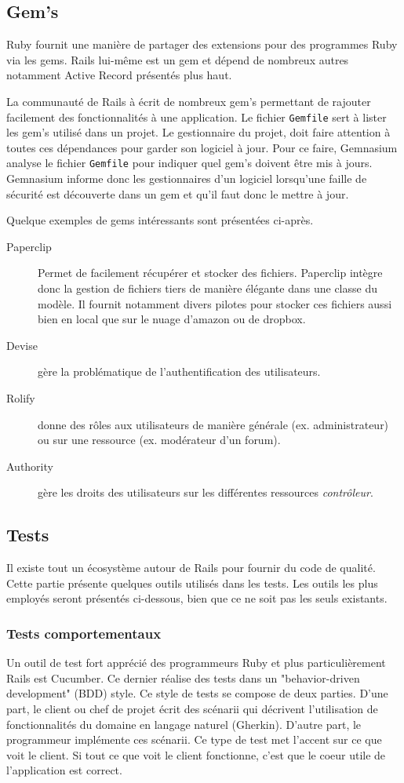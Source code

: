 \subsection{Gem's}
\label{gems}
Ruby fournit une manière de partager des extensions pour des programmes Ruby via les gems. Rails lui-même est un gem et dépend de nombreux autres notamment Active Record présentés plus haut.

La communauté de Rails à écrit de nombreux gem's permettant de rajouter facilement des fonctionnalités à une application. Le fichier \texttt{Gemfile} sert à lister les gem's utilisé dans un projet. Le gestionnaire du projet, doit faire attention à toutes ces dépendances pour garder son logiciel à jour. Pour ce faire, Gemnasium analyse le fichier \texttt{Gemfile} pour indiquer quel gem's doivent être mis à jours. Gemnasium informe donc les gestionnaires d'un logiciel lorsqu'une faille de sécurité est découverte dans un gem et qu'il faut donc le mettre à jour.

Quelque exemples de gems intéressants sont présentées ci-après.
\begin{description}
  \item[Paperclip] Permet de facilement récupérer et stocker des fichiers. Paperclip intègre donc la gestion de fichiers tiers de manière élégante dans une classe du modèle. Il fournit notamment divers pilotes pour stocker ces fichiers aussi bien en local que sur le nuage d'amazon ou de dropbox.
  \item[Devise] gère la problématique de l'authentification des utilisateurs.
  \item[Rolify] donne des rôles aux utilisateurs de manière générale (ex. administrateur) ou sur une ressource (ex. modérateur d'un forum).\label{rolify}
  \item[Authority] gère les droits des utilisateurs sur les différentes ressources \textit{contrôleur}. \label{authority}
\end{description}

\subsection{Tests}
\label{rails-tests}
Il existe tout un écosystème autour de Rails pour fournir du code de qualité. Cette partie présente quelques outils utilisés dans les tests. Les outils les plus employés seront présentés ci-dessous, bien que ce ne soit pas les seuls existants.

\subsubsection{Tests comportementaux}
\label{cucumber}
Un outil de test fort apprécié des programmeurs Ruby et plus particulièrement Rails est Cucumber. Ce dernier réalise des tests dans un "behavior-driven development" (BDD) style. Ce style de tests se compose de deux parties. D'une part, le client ou chef de projet écrit des scénarii qui décrivent l'utilisation de fonctionnalités du domaine en langage naturel (Gherkin). D'autre part, le programmeur implémente ces scénarii. Ce type de test met l'accent sur ce que voit le client. Si tout ce que voit le client fonctionne, c'est que le coeur utile de l'application est correct. 

